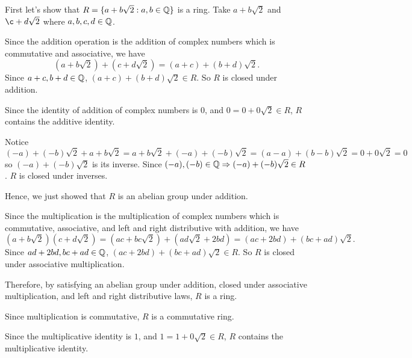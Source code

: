 \documentclass[12pt]{article}
\begin{document}
\begin{problem}[18.12]
First let's show that $ R = \{a+b \sqrt{2}:a , b \in \mathbb{Q} \} $ is a ring. Take $ a+b\sqrt{2} $ and $ \c+d \sqrt{2} $ where $ a,b,c,d \in \mathbb{Q}$.

Since the addition operation is the addition of complex numbers which is commutative and associative, we have
\[
	(a+b\sqrt{2} ) + (c+ d \sqrt{2} ) = (a+c) + (b+d) \sqrt{2} 
.\] 
Since $ a+c, b+d \in \mathbb{Q}$, $ (a+c)+(b+d) \sqrt{2} \in R $. So $ R$ is closed under addition.

Since the identity of addition of complex numbers is 0, and $ 0= 0+0 \sqrt{2} \in R $, $ R$ contains the additive identity.

Notice
\[
	(-a)+(-b) \sqrt{2} + a+b \sqrt{2} = a+b \sqrt{2} + (-a) + (-b)\sqrt{2} = (a-a) + (b-b) \sqrt{2} = 0 + 0 \sqrt{2} = 0 
\]
so $ (-a)+(-b)\sqrt{2} $ is its inverse. Since $(-a),(-b) \in \mathbb{Q} \Rightarrow (-a)+(-b) \sqrt{2}  \in R$. $ R$ is closed under inverses.

Hence, we just showed that $ R$ is an abelian group under addition.

Since the multiplication is the multiplication of complex numbers which is commutative, associative, and left and right distributive with addition, we have
 \[
	 (a+b\sqrt{2} )(c+d\sqrt{2} )=(ac+bc\sqrt{2}) + (ad\sqrt{2} + 2bd)=(ac+2bd)+(bc+ad)\sqrt{2}  
.\] 
Since $ ad+2bd, bc+ad \in \mathbb{Q}$, $ (ac+2bd)+(bc+ad)\sqrt{2} \in R $. So $ R$ is closed under associative multiplication.

Therefore, by satisfying an abelian group under addition, closed under associative multiplication, and left and right distributive laws, $ R$ is a ring.

Since multiplication is commutative, $ R$ is a commutative ring.

Since the multiplicative identity is  $ 1$, and  $ 1 = 1 + 0\sqrt{2} \in R $, $ R$ contains the multiplicative identity.


\end{problem}
\end{document}

